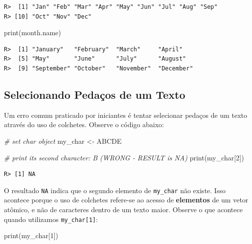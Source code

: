 \documentclass[
  11pt,
]{book}
\newenvironment{Shaded}{\begin{snugshade}}{\end{snugshade}}
\newcommand{\CommentTok}[1]{\textcolor[rgb]{0.37,0.37,0.37}{\textit{#1}}}
\newcommand{\DecValTok}[1]{\textcolor[rgb]{0.06,0.06,0.06}{#1}}
\newcommand{\FunctionTok}[1]{\textcolor[rgb]{0,0,0}{#1}}
\newcommand{\NormalTok}[1]{#1}
\newcommand{\OtherTok}[1]{\textcolor[rgb]{0.37,0.37,0.37}{#1}}
\newcommand{\StringTok}[1]{\textcolor[rgb]{0.5,0.5,0.5}{#1}}
\begin{document}
\begin{verbatim}
R>  [1] "Jan" "Feb" "Mar" "Apr" "May" "Jun" "Jul" "Aug" "Sep"
R> [10] "Oct" "Nov" "Dec"
\end{verbatim}

\begin{Shaded}
\begin{Highlighting}[]
\FunctionTok{print}\NormalTok{(month.name)}
\end{Highlighting}
\end{Shaded}

\begin{verbatim}
R>  [1] "January"   "February"  "March"     "April"    
R>  [5] "May"       "June"      "July"      "August"   
R>  [9] "September" "October"   "November"  "December"
\end{verbatim}

\hypertarget{selecionando-pedauxe7os-de-um-texto}{%
\subsection{Selecionando Pedaços de um Texto}\label{selecionando-pedauxe7os-de-um-texto}}

Um erro comum praticado por iniciantes é tentar selecionar pedaços de um texto através do uso de colchetes. Observe o código abaixo:

\begin{Shaded}
\begin{Highlighting}[]
\CommentTok{\# set char object}
\NormalTok{my\_char }\OtherTok{\textless{}{-}} \StringTok{\textquotesingle{}ABCDE\textquotesingle{}}

\CommentTok{\# print its second character: \textquotesingle{}B\textquotesingle{} (WRONG {-} RESULT is NA)}
\FunctionTok{print}\NormalTok{(my\_char[}\DecValTok{2}\NormalTok{])}
\end{Highlighting}
\end{Shaded}

\begin{verbatim}
R> [1] NA
\end{verbatim}

O resultado \texttt{NA} indica que o segundo elemento de \texttt{my\_char} não existe. Isso acontece porque o uso de colchetes refere-se ao acesso de \textbf{elementos} de um vetor atômico, e não de caracteres dentro de um texto maior. Observe o que acontece quando utilizamos \texttt{my\_char{[}1{]}}:

\begin{Shaded}
\begin{Highlighting}[]
\FunctionTok{print}\NormalTok{(my\_char[}\DecValTok{1}\NormalTok{])}
\end{Highlighting}
\end{Shaded}
\end{document}
